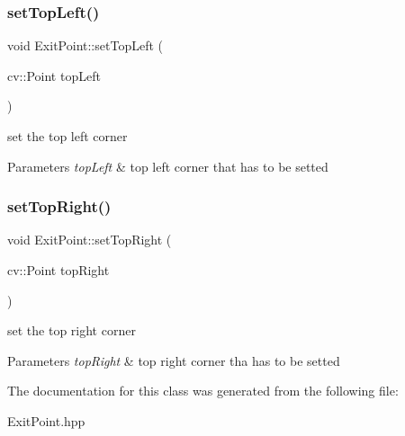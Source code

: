 \subsubsection{\texorpdfstring{set\+Top\+Left()}{setTopLeft()}}
{\footnotesize\ttfamily void Exit\+Point\+::set\+Top\+Left (\begin{DoxyParamCaption}\item[{cv\+::\+Point}]{top\+Left }\end{DoxyParamCaption})}

set the top left corner 
\begin{DoxyParams}{Parameters}
{\em top\+Left} & top left corner that has to be setted \\
\hline
\end{DoxyParams}
\mbox{\label{class_exit_point_ae27c395eb18321cb120b99ffbed6028a}} 
\subsubsection{\texorpdfstring{set\+Top\+Right()}{setTopRight()}}
{\footnotesize\ttfamily void Exit\+Point\+::set\+Top\+Right (\begin{DoxyParamCaption}\item[{cv\+::\+Point}]{top\+Right }\end{DoxyParamCaption})}

set the top right corner 
\begin{DoxyParams}{Parameters}
{\em top\+Right} & top right corner tha has to be setted \\
\hline
\end{DoxyParams}


The documentation for this class was generated from the following file\+:\begin{DoxyCompactItemize}
\item 
Exit\+Point.\+hpp\end{DoxyCompactItemize}
